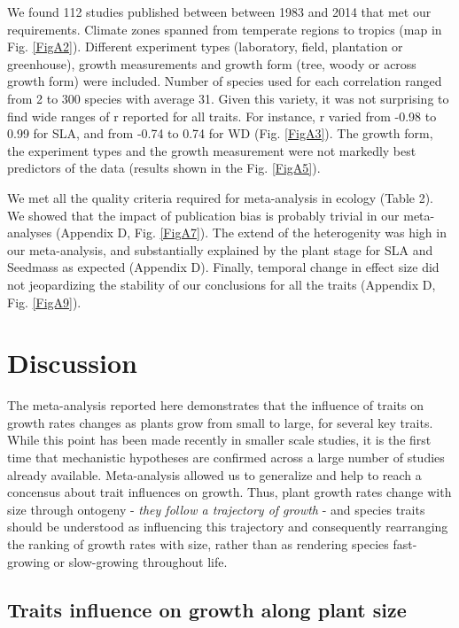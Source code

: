 \documentclass[a4paper]{article}\usepackage[]{graphicx}\usepackage[]{color}
\begin{document}
We found 112 studies published between between 1983 and 2014 that met our requirements. Climate zones spanned from temperate regions to  tropics (map in Fig. \ref{FigA2}). Different experiment types (laboratory, field, plantation or greenhouse), growth measurements and growth form (tree, woody or across growth form) were included. Number of species used for each correlation ranged from 2 to 300 species with average 31. Given this variety, it was not surprising to find wide ranges of r reported for all traits. For instance, r varied from -0.98 to 0.99 for SLA, and from -0.74 to 0.74 for WD (Fig. \ref{FigA3}). The growth form, the experiment types and the growth measurement were not markedly best predictors of the data (results shown in the Fig. \ref{FigA5}). 

We met all the quality criteria required for meta-analysis in ecology (Table 2). We showed that the impact of publication bias is probably trivial in our meta-analyses (Appendix D, Fig. \ref{FigA7}). The extend of the heterogenity was high in our meta-analysis, and substantially explained by the plant stage for SLA and Seedmass as expected (Appendix D). Finally, temporal change in effect size did not jeopardizing the stability of our conclusions for all the traits (Appendix D, Fig. \ref{FigA9}).


\section*{Discussion}\label{discussion}

The meta-analysis reported here demonstrates that the influence of traits on growth rates changes as plants grow from small to large, for several key traits. While this point has been made recently in smaller scale studies, it is the first time that mechanistic hypotheses are confirmed across a large number of studies already available. Meta-analysis allowed us to generalize and help to reach a concensus about trait influences on growth. Thus, plant growth rates change with size through ontogeny \citep{Condit:1993hd, Clark:1999ed, Herault:2011dd} - \textit{they follow a trajectory of growth} - and species traits should be understood as influencing this trajectory and consequently rearranging the ranking of growth rates with size, rather than as rendering species fast-growing or slow-growing throughout life. 

\subsection*{Traits influence on growth along plant size}
\end{document}
